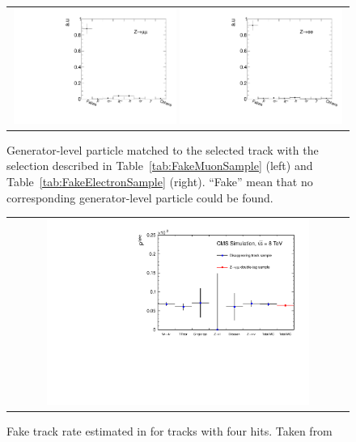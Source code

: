\begin{figure}[!bt]
  \centering 
  \begin{tabular}{c}
    \includegraphics[width=0.49\textwidth]{figures/analysis/AnalysisSelection/ParticleCompositionInFakeCS_Mu.pdf}
    \includegraphics[width=0.49\textwidth]{figures/analysis/AnalysisSelection/ParticleCompositionInFakeCS_Ele.pdf}
  \end{tabular}
  \caption{Generator-level particle matched to the selected track with the selection described in Table~\ref{tab:FakeMuonSample} (left) and Table~\ref{tab:FakeElectronSample} (right). ``Fake'' mean that no corresponding generator-level particle could be found. }
\vspace{30pt}
  \label{fig:BkgComposition}
\end{figure}

\begin{figure}[!bt]
  \centering 
  \begin{tabular}{c}
    \includegraphics[width=0.79\textwidth]{figures/analysis/AnalysisSelection/fakeTrkRates.pdf}
  \end{tabular}
  \caption{Fake track rate estimated in \cite{bib:CMS:DT_Thesis,bib:CMS:DT_8TeV_AN} for tracks with four hits. Taken from \cite{bib:CMS:DT_8TeV_AN} }
  \label{fig:FakeRate}
\vspace{30pt}
\end{figure}


